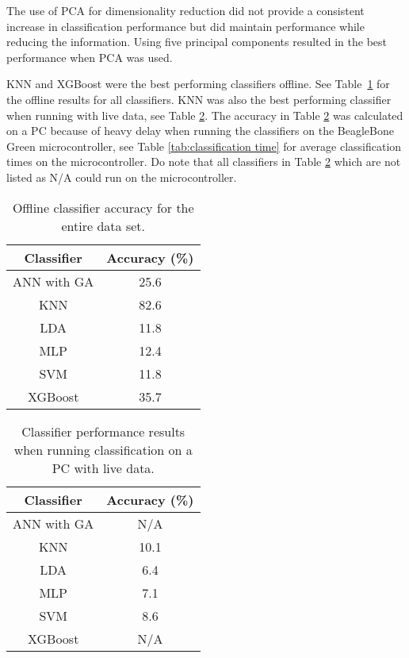 The use of PCA for dimensionality reduction did not provide a consistent increase in classification performance but did maintain performance while reducing the information. Using five principal components resulted in the best performance when PCA was used.

KNN and XGBoost were the best performing classifiers offline. See Table~\ref{tab:offline classifier} for the offline results for all classifiers.
KNN was also the best performing classifier when running with live data, see Table \ref{tab:real-time classifier}. The accuracy in Table \ref{tab:real-time classifier} was calculated on a PC because of heavy delay when running the classifiers on the BeagleBone Green microcontroller, see Table \ref{tab:classification time} for average classification times on the microcontroller. Do note that all classifiers in Table \ref{tab:real-time classifier} which are not listed as N/A could run on the microcontroller. 
\begin{table}[ht]
    \centering
    \begin{tabular}{c|c}
         \hline
         Classifier & Accuracy (\%) \\
         \hline
         ANN with GA & 25.6 \\
         KNN & 82.6 \\
         LDA & 11.8 \\
         MLP & 12.4 \\
         SVM & 11.8 \\
         XGBoost & 35.7
    \end{tabular}
    \caption{Offline classifier accuracy for the entire data set.}
    \label{tab:offline classifier}
\end{table}
\begin{table}[ht]
    \centering
    \begin{tabular}{c|c}
         \hline
         Classifier & Accuracy (\%) \\
         \hline
         ANN with GA & N/A \\
         KNN & 10.1 \\ %
         LDA & 6.4 \\ %
         MLP & 7.1 \\ %
         SVM & 8.6 \\ %
         XGBoost & N/A %
    \end{tabular}
    \caption{Classifier performance results when running classification on a PC with live data.}
    \label{tab:real-time classifier}
\end{table}
